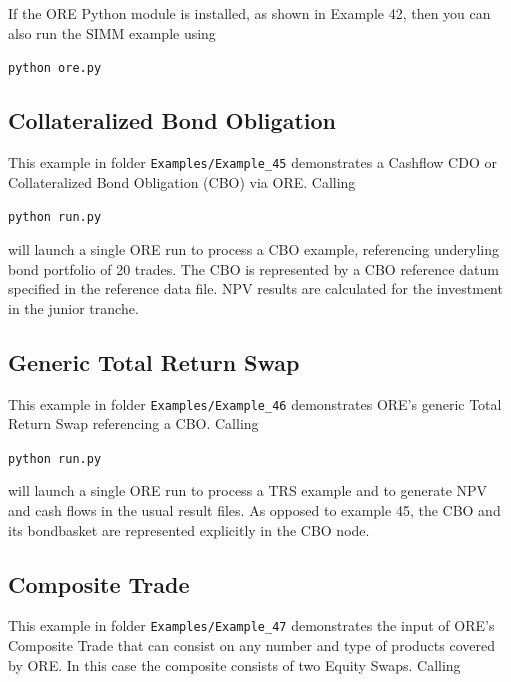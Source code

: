\documentclass[12pt, a4paper]{article}
\begin{document}
\bigskip
If the ORE Python module is installed, as shown in Example 42, then you can also run the SIMM example using

\medskip
\centerline{\tt python ore.py} 

\subsection{Collateralized Bond Obligation}%

This example in folder {\tt Examples/Example\_45} demonstrates a Cashflow CDO or Collateralized Bond Obligation (CBO) via ORE. Calling

\medskip
\centerline{\tt python run.py}

\medskip
will launch a single ORE run to process a CBO example, referencing underyling bond portfolio of 20 trades. 
The CBO is represented by a CBO reference datum specified in the reference data file. 
NPV results are calculated for the investment in the junior tranche. 

\subsection{Generic Total Return Swap}%

This example in folder {\tt Examples/Example\_46} demonstrates ORE's generic Total Return Swap referencing a CBO. 
Calling

\medskip
\centerline{\tt python run.py}

\medskip
will launch a single ORE run to process a TRS example and to generate NPV and cash flows in the usual result files.
As opposed to example 45, the CBO and its bondbasket are represented explicitly in the CBO node.

\subsection{Composite Trade}%

This example in folder {\tt Examples/Example\_47} demonstrates the input of ORE's Composite Trade that can consist on any number 
and type of products covered by ORE. In this case the composite consists of two Equity Swaps.
Calling
\end{document}
